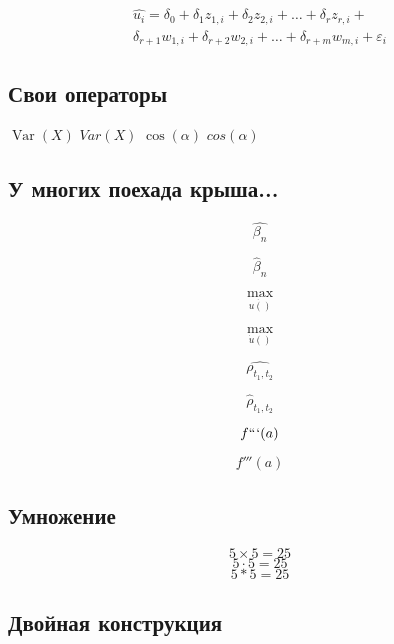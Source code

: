 \documentclass[12pt, a4paper]{article}
\DeclareMathOperator{\Var}{Var}
\begin{document}
\vspace{5mm}

  \begin{multline}
\hat{u_i} =\delta_0+\delta_1 z_{1,i} + \delta_2 z_{2,i}+ \ldots + \delta_r z_{r,i}+ \\
 \delta_{r+1} w_{1,i} + \delta_{r+2} w_{2,i} + \ldots + \delta_{r+m} w_{m,i} +\varepsilon_i  
 \tag{æææææ}
  \end{multline} 


\subsection{Свои операторы} 


$\Var(X)$  \hspace{5mm} $Var(X)$ \hspace{5mm} $\cos(\alpha)$  \hspace{5mm} $cos(\alpha)$

\subsection{У многих поехада крыша...}

\[ \hat{\beta_n} \]

\[ \hat{\beta}_n \]


\def \b{\hat{\beta}}

\[ \underset{\dot{ u()} }{\max} \]

\[ \underset{\dot{u}() }{\max} \]


\[ \hat{\rho_{t_1,t_2}} \]

\[ \hat\rho_{t_1,t_2} \]


\[ f```(a) \] 

\[ f'''(a) \] 

\subsection{Умножение} 

\[ 5 \times 5 = 25 \] 
\[ 5 \cdot 5 = 25 \] 
\[ 5 * 5 = 25 \] 

\subsection{Двойная конструкция}
\end{document}
